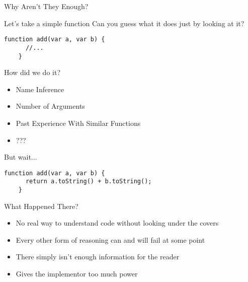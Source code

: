 \begin{section}{Why Aren't They Enough?}

\begin{frame}[fragile]{Let's take a simple function}
  Can you guess what it does just by looking at it?
  \begin{lstlisting}[style=javascript]
    function add(var a, var b) {
      //...
    }
  \end{lstlisting}
\end{frame}

\begin{frame}{How did we do it?}
  \begin{center}
    \begin{itemize}
    \item Name Inference
    \item Number of Arguments
    \item Past Experience With Similar Functions
    \item ???
    \end{itemize}
\end{center}
\end{frame}

\begin{frame}[fragile]{But wait...}
    \begin{lstlisting}[style=javascript]
    function add(var a, var b) {
      return a.toString() + b.toString();
    }
  \end{lstlisting}
\end{frame}

\begin{frame}{What Happened There?}
  \begin{itemize}
    \item No real way to understand code without looking under the covers
    \item Every other form of reasoning can and will fail at some point
    \item There simply isn't enough information for the reader
    \item Gives the implementor too much power
  \end{itemize}
\end{frame}

\end{section}
